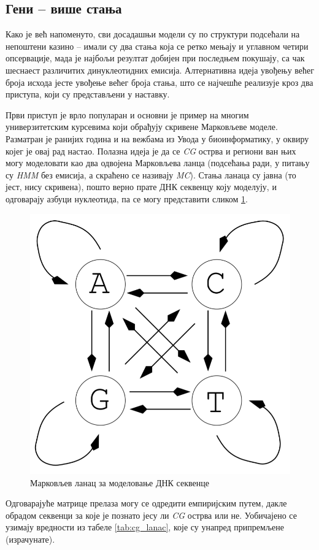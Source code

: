 \documentclass[12pt,oneside]{memoir}
\begin{document}
\begin{CJK}{UTF8}{ipxm}
\section{Гени -- више стања}
Како је већ напоменуто, сви досадашњи модели су по структури подсећали на непоштени казино -- имали су два стања која се ретко мењају и углавном четири опсервације, мада је најбољи резултат добијен при последњем покушају, са чак шеснаест различитих динуклеотидних емисија. Алтернативна идеја увођењу већег броја исхода јесте увођење већег броја стања, што се најчешће реализује кроз два приступа, који су представљени у наставку.

Први приступ је врло популаран и основни је пример на многим универзитетским курсевима који обрађују скривене Марковљеве моделе\cite{holmes2012, huson2020, kellis2021, shamir2009}. Разматран је ранијих година и на вежбама из Увода у биоинформатику, у оквиру којег је овај рад настао. Полазна идеја је да се \textit{CG} острва и региони ван њих могу моделовати као два одвојена Марковљева ланца (подсећања ради, у питању су \textit{HMM} без емисија, а скраћено се називају \textit{MC}). Стања ланаца су јавна (то јест, нису скривена), пошто верно прате ДНК секвенцу коју моделују, и одговарају азбуци нуклеотида, па се могу представити сликом \ref{fig:cg_lanac}.

\begin{figure}[H]
  \centering
  \includegraphics[width=.5\textwidth]{cg_lanac.png}
  \caption{Марковљев ланац за моделовање ДНК секвенце\cite{huson2020}}
  \label{fig:cg_lanac}
\end{figure}

Одговарајуће матрице прелаза могу се одредити емпиријским путем, дакле обрадом секвенци за које је познато јесу ли \textit{CG} острва или не. Уобичајено се узимају вредности из табеле \ref{tab:cg_lanac}, које су унапред припремљене (израчунате).


\end{CJK}
\end{document}
